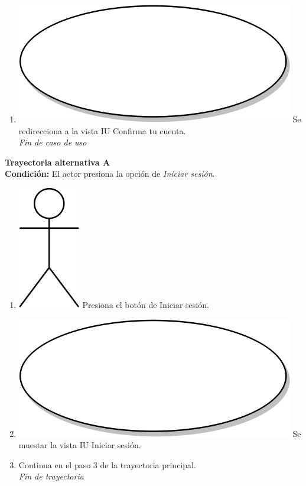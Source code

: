 \begin{enumerate}
  \item {\includegraphics[scale=.1]{Capitulo3/img/proceso.png} Se redirecciona a la vista IU Confirma tu cuenta.}\\
  \textit{Fin de caso de uso} \\	
\end{enumerate}

\textbf{Trayectoria alternativa A} \label{cu2_ta_a} \\
\textbf{Condición:} El actor presiona la opción de \textit{Iniciar sesión}.\\
 \begin{enumerate}[label=A\arabic*]
  \item {\includegraphics[scale=.1]{Capitulo3/img/actor.png} Presiona el botón de Iniciar sesión.}
  \item {\includegraphics[scale=.05]{Capitulo3/img/proceso.png} Se muestar la vista IU Iniciar sesión.}
    \item {Continua en el paso 3 de la trayectoria principal.} \\
    \textit{Fin de trayectoria} \\
\end{enumerate}

